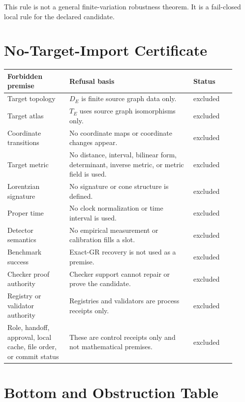 \documentclass[11pt]{article}
\begin{document}
This rule is not a general finite-variation robustness theorem. It is a
fail-closed local rule for the declared candidate.

\section{No-Target-Import Certificate}

\begin{longtable}{p{0.25\linewidth}p{0.50\linewidth}p{0.17\linewidth}}
\toprule
Forbidden premise & Refusal basis & Status \\
\midrule
Target topology & \(D_E\) is finite source graph data only. & excluded \\
Target atlas & \(T_E\) uses source graph isomorphisms only. & excluded \\
Coordinate transitions & No coordinate maps or coordinate changes appear. & excluded \\
Target metric & No distance, interval, bilinear form, determinant, inverse
metric, or metric field is used. & excluded \\
Lorentzian signature & No signature or cone structure is defined. & excluded \\
Proper time & No clock normalization or time interval is used. & excluded \\
Detector semantics & No empirical measurement or calibration fills a slot. & excluded \\
Benchmark success & Exact-GR recovery is not used as a premise. & excluded \\
Checker proof authority & Checker support cannot repair or prove the candidate. & excluded \\
Registry or validator authority & Registries and validators are process receipts only. & excluded \\
Role, handoff, approval, local cache, file order, or commit status & These are
control receipts only and not mathematical premises. & excluded \\
\bottomrule
\end{longtable}

\section{Bottom and Obstruction Table}
\end{document}
